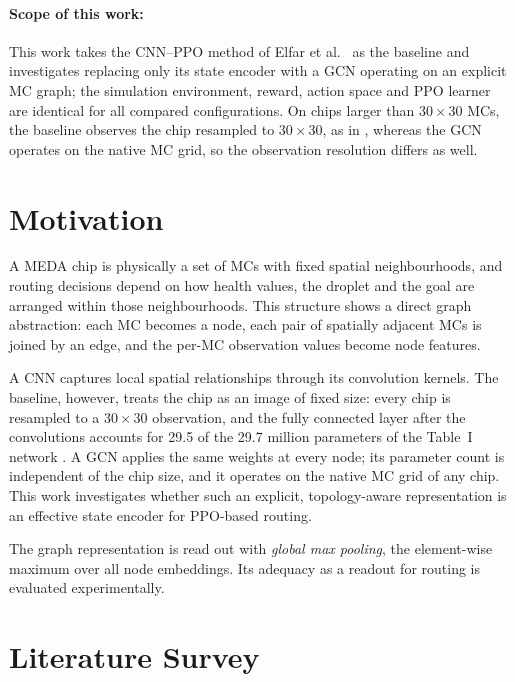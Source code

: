 \documentclass[11pt,a4paper]{article}
\begin{document}
\paragraph{Scope of this work:}
This work takes the CNN--PPO method of Elfar et al.\ \cite{elfar2023} as the
baseline and investigates replacing only its state encoder with a GCN
operating on an explicit MC graph; the simulation environment, reward, action
space and PPO learner are identical for all compared configurations. On chips
larger than $30\times30$ MCs, the baseline observes the chip resampled to
$30\times30$, as in \cite{elfar2023}, whereas the GCN operates on the native MC
grid, so the observation resolution differs as well.

\section{Motivation}\label{sec:motivation}

A MEDA chip is physically a set of MCs with fixed spatial neighbourhoods, and
routing decisions depend on how health values, the droplet and the goal are
arranged within those neighbourhoods. This structure shows a direct graph
abstraction: each MC becomes a node, each pair of spatially adjacent MCs is
joined by an edge, and the per-MC observation values become node features.

A CNN captures local spatial relationships through its convolution kernels.
The baseline, however, treats the chip as an image of fixed size: every chip
is resampled to a $30\times30$ observation, and the fully connected layer
after the convolutions accounts for 29.5 of the 29.7 million parameters of the
Table~I network \cite{elfar2023}. A GCN applies the same weights at every
node; its parameter count is independent of the chip size, and it operates on
the native MC grid of any chip. This work investigates whether such an
explicit, topology-aware representation is an effective state encoder for
PPO-based routing.

The graph representation is read out with \emph{global max pooling}, the
element-wise maximum over all node embeddings. Its adequacy as a readout for
routing is evaluated experimentally.

\section{Literature Survey}\label{sec:lit}
\end{document}

